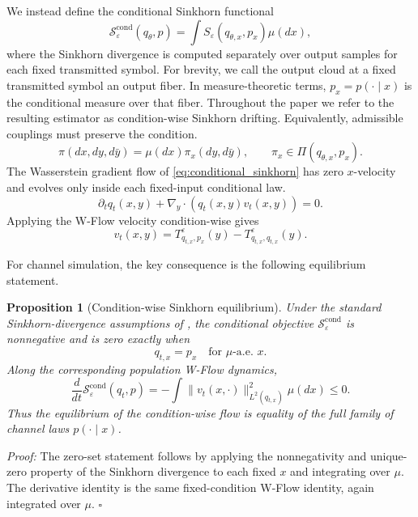 \documentclass[10pt,journal]{IEEEtran}
\newtheorem{proposition}{Proposition}
\begin{document}
We instead define the conditional Sinkhorn functional
\begin{equation}
\mathcal{S}^{\mathrm{cond}}_{\varepsilon}(q_\theta,p)
=
\int
S_{\varepsilon}\!\left(q_{\theta,x},p_x\right)
\mu(dx),
\label{eq:conditional_sinkhorn}
\end{equation}
where the Sinkhorn divergence is computed separately over output samples for each fixed transmitted symbol.
For brevity, we call the output cloud at a fixed transmitted symbol an output fiber.
In measure-theoretic terms, \(p_x=p(\cdot\mid x)\) is the conditional measure over that fiber.
Throughout the paper we refer to the resulting estimator as condition-wise Sinkhorn drifting.
Equivalently, admissible couplings must preserve the condition.
\begin{equation}
\pi(dx,dy,d\bar y)
=
\mu(dx)\pi_x(dy,d\bar y),
\qquad
\pi_x \in \Pi(q_{\theta,x},p_x).
\end{equation}
The Wasserstein gradient flow of \eqref{eq:conditional_sinkhorn} has zero \(x\)-velocity and evolves only inside each fixed-input conditional law.
\begin{equation}
\partial_t q_t(x,y)
+
\nabla_y\!\cdot
\left(
q_t(x,y)v_t(x,y)
\right)
=0.
\end{equation}
Applying the W-Flow velocity condition-wise gives
\begin{equation}
v_t(x,y)
=
T^{\varepsilon}_{q_{t,x},p_x}(y)
-
T^{\varepsilon}_{q_{t,x},q_{t,x}}(y).
\label{eq:condition_sinkhorn_velocity}
\end{equation}

For channel simulation, the key consequence is the following equilibrium statement.
\begin{proposition}[Condition-wise Sinkhorn equilibrium]
Under the standard Sinkhorn-divergence assumptions of \cite{feydy2019sinkhorn}, the conditional objective \(\mathcal{S}^{\mathrm{cond}}_{\varepsilon}\) is nonnegative and is zero exactly when
\begin{equation}
q_{t,x}=p_x
\quad
\text{for } \mu\text{-a.e. }x.
\end{equation}
Along the corresponding population W-Flow dynamics,
\begin{equation}
\frac{d}{dt}\mathcal{S}^{\mathrm{cond}}_{\varepsilon}(q_t,p)
=
-
\int
\|v_t(x,\cdot)\|_{L^2(q_{t,x})}^2
\mu(dx)
\leq 0.
\end{equation}
Thus the equilibrium of the condition-wise flow is equality of the full family of channel laws \(p(\cdot\mid x)\).
\end{proposition}
\emph{Proof:}
The zero-set statement follows by applying the nonnegativity and unique-zero property of the Sinkhorn divergence to each fixed \(x\) and integrating over \(\mu\).
The derivative identity is the same fixed-condition W-Flow identity, again integrated over \(\mu\).
\hfill\(\square\)
\end{document}
